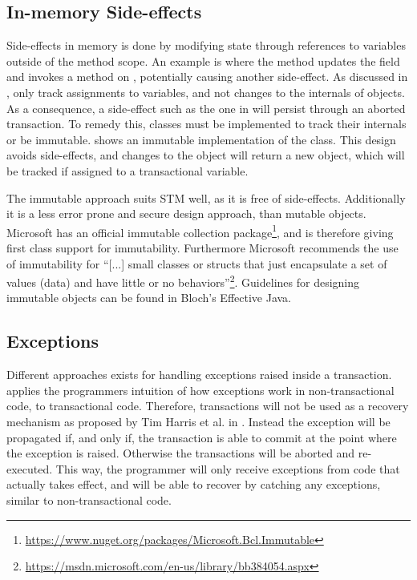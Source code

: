 \subsection{In-memory Side-effects}
Side-effects in memory is done by modifying state through references to variables outside of the method scope. An example is  where the  method updates the field  and invokes a method on  , potentially causing another side-effect. As discussed in , \stmname only track assignments to variables, and not changes to the internals of objects. As a consequence, a side-effect such as the one in  will persist through an aborted transaction. To remedy this, classes must be implemented to track their internals or be immutable.  shows an immutable implementation of the   class. This design avoids side-effects, and changes to the object will return a new object, which will be tracked if assigned to a transactional variable.

The immutable approach suits \ac{STM} well, as it is free of side-effects. Additionally it is a less error prone and secure design approach, than mutable objects\cite[p. 73]{bloch2008effective}. Microsoft has an official immutable collection package\footnote{\url{https://www.nuget.org/packages/Microsoft.Bcl.Immutable}}, and is therefore giving first class support for immutability. Furthermore Microsoft recommends the use of immutability for ``[...] small classes or structs that just encapsulate a set of values (data) and have little or no behaviors''\footnote{\url{https://msdn.microsoft.com/en-us/library/bb384054.aspx}}. Guidelines for designing immutable objects can be found in Bloch's Effective Java\cite[p. 73-80]{bloch2008effective}.

\subsection{Exceptions}
Different approaches exists for handling exceptions raised inside a transaction. \stmnamesp applies the programmers intuition of how exceptions work in non-transactional code, to transactional code. Therefore, transactions will not be used as a recovery mechanism as proposed by Tim Harris et al. in \cite{harris2005exceptions}.  Instead the exception will be propagated if, and only if, the transaction is able to commit at the point where the exception is raised. Otherwise the transactions will be aborted and re-executed. This way, the programmer will only receive exceptions from code that actually takes effect, and will be able to recover by catching any exceptions, similar to non-transactional code.

